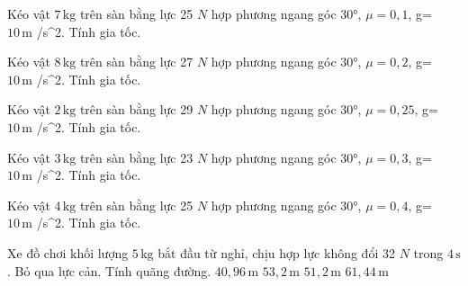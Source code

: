 \begin{bt}
Kéo vật $7\,\text{kg}$ trên sàn bằng lực 25 $N$ hợp phương ngang góc 30°, $\mu=0,1$, g= $10\,\text{m}$ /s^2. Tính gia tốc.
\end{bt}

\begin{bt}
Kéo vật $8\,\text{kg}$ trên sàn bằng lực 27 $N$ hợp phương ngang góc 30°, $\mu=0,2$, g= $10\,\text{m}$ /s^2. Tính gia tốc.
\end{bt}

\begin{bt}
Kéo vật $2\,\text{kg}$ trên sàn bằng lực 29 $N$ hợp phương ngang góc 30°, $\mu=0,25$, g= $10\,\text{m}$ /s^2. Tính gia tốc.
\end{bt}

\begin{bt}
Kéo vật $3\,\text{kg}$ trên sàn bằng lực 23 $N$ hợp phương ngang góc 30°, $\mu=0,3$, g= $10\,\text{m}$ /s^2. Tính gia tốc.
\end{bt}

\begin{bt}
Kéo vật $4\,\text{kg}$ trên sàn bằng lực 25 $N$ hợp phương ngang góc 30°, $\mu=0,4$, g= $10\,\text{m}$ /s^2. Tính gia tốc.
\end{bt}

\begin{ex}
Xe đồ chơi khối lượng $5\,\text{kg}$ bắt đầu từ nghỉ, chịu hợp lực không đổi 32 $N$ trong $4\,\text{s}$. Bỏ qua lực cản. Tính quãng đường.
\choice
{$40,96\,\text{m}$}
{$53,2\,\text{m}$}
{\True $51,2\,\text{m}$}
{$61,44\,\text{m}$}
\end{ex}

